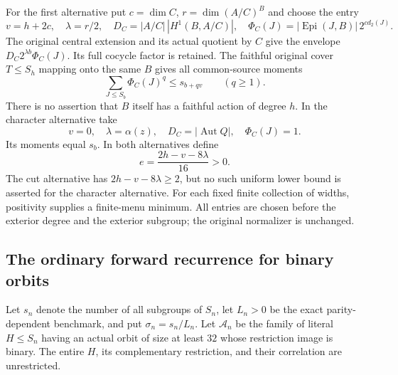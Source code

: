 For the first alternative put $c=\dim C$, $r=\dim(A/C)^B$ and choose
the entry
\begin{equation}\label{eq:binary-cut-entry-original}
 v=h+2c,\quad \lambda=r/2,\quad
 D_C=|A/C|\,|H^1(B,A/C)|,\quad
 \Phi_C(J)=|\operatorname{Epi}(J,B)|\,2^{c d_2(J)}.
\end{equation}
The original central extension and its actual quotient by $C$ give
the envelope $D_C2^{\lambda b}\Phi_C(J)$. Its full cocycle factor is
retained. The faithful original cover $T\leq S_h$ mapping onto the
same $B$ gives all common-source moments
\[
 \sum_{J\leq S_b}\Phi_C(J)^q\leq s_{b+qv}
 \qquad(q\geq1).
\]
There is no assertion that $B$ itself has a faithful action of degree
$h$. In the character alternative take
\[
 v=0,\quad\lambda=\alpha(z),\quad
 D_C=|\operatorname{Aut}Q|,\quad\Phi_C(J)=1.
\]
Its moments equal $s_b$. In both alternatives define
\[
 e=\frac{2h-v-8\lambda}{16}>0.
\]
The cut alternative has $2h-v-8\lambda\geq2$, but no such uniform
lower bound is asserted for the character alternative. For each fixed
finite collection of widths, positivity supplies a finite-menu minimum.
All entries are chosen before the exterior degree and the exterior
subgroup; the original normalizer is unchanged.

\subsection{The ordinary forward recurrence for binary orbits}

Let $s_n$ denote the number of all subgroups of $S_n$, let
$L_n>0$ be the exact parity-dependent benchmark, and put
$\sigma_n=s_n/L_n$. Let $\mathcal A_n$ be the family of
literal $H\leq S_n$ having an actual orbit of size at least $32$ whose
restriction image is binary. The entire $H$, its complementary
restriction, and their correlation are unrestricted.


